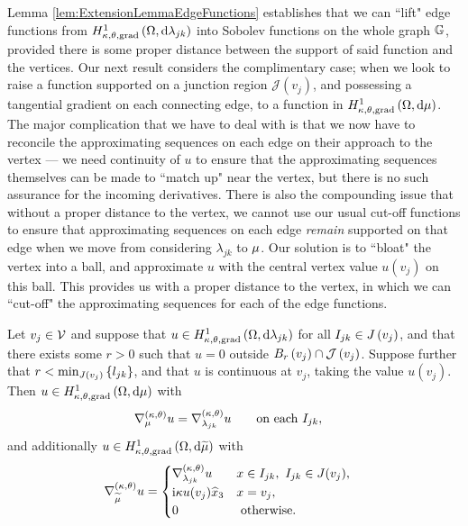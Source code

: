 Lemma \ref{lem:ExtensionLemmaEdgeFunctions} establishes that we can ``lift" edge functions from $H^1_{\kappa,\theta,\mathrm{grad}}\left( \Omega, \mathrm{d}\lambda_{jk} \right)$ into Sobolev functions on the whole graph $\mathbb{G}$, provided there is some proper distance between the support of said function and the vertices.
Our next result considers the complimentary case; when we look to raise a function supported on a junction region $\mathcal{J}(v_j)$, and possessing a tangential gradient on each connecting edge, to a function in $H^1_{\kappa,\theta,\mathrm{grad}}\left( \Omega, \mathrm{d}\mu \right)$.
The major complication that we have to deal with is that we now have to reconcile the approximating sequences on each edge on their approach to the vertex --- we need continuity of $u$ to ensure that the approximating sequences themselves can be made to ``match up" near the vertex, but there is no such assurance for the incoming derivatives.
There is also the compounding issue that without a proper distance to the vertex, we cannot use our usual cut-off functions to ensure that approximating sequences on each edge \emph{remain} supported on that edge when we move from considering $\lambda_{jk}$ to $\mu$.
Our solution is to ``bloat" the vertex into a ball, and approximate $u$ with the central vertex value $u(v_j)$ on this ball.
This provides us with a proper distance to the vertex, in which we can ``cut-off" the approximating sequences for each of the edge functions.
\begin{lemma} \label{lem:ExtensionLemmaVertexFunctions}
	Let $v_j\in\mathcal{V}$ and suppose that $u\in H^1_{\kappa,\theta,\mathrm{grad}}\left( \Omega, \mathrm{d}\lambda_{jk} \right)$ for all $I_{jk}\in J\left( v_j \right)$, and that there exists some $r>0$ such that $u=0$ outside $B_r\left( v_j \right)\cap \mathcal{J}\left( v_j \right)$.
	Suppose further that $r<\min_{J\left( v_j \right)}\left\{ l_{jk} \right\}$, and that $u$ is continuous at $v_j$, taking the value $u(v_j)$.
	Then $u\in H^1_{\kappa,\theta,\mathrm{grad}}\left( \Omega, \mathrm{d}\mu \right)$ with
	\begin{align*}
		\nabla^{\left( \kappa, \theta \right)}_{\mu}u &= \nabla^{\left( \kappa, \theta \right)}_{\lambda_{jk}}u \qquad\text{on each } I_{jk},
	\end{align*}
	and additionally $u\in H^1_{\kappa,\theta,\mathrm{grad}}\left( \Omega, \mathrm{d}\widetilde{\mu} \right)$ with
	\begin{align*}
		\nabla^{\left( \kappa, \theta \right)}_{\widetilde{\mu}}u &= 
		\begin{cases}
			\nabla^{\left( \kappa, \theta \right)}_{\lambda_{jk}}u & x\in I_{jk}, \ I_{jk}\in J(v_j), \\
			\mathrm{i}\kappa u(v_j)\widehat{x}_3 & x=v_j, \\
			0 & \text{ otherwise}.
		\end{cases}
	\end{align*}
\end{lemma}
